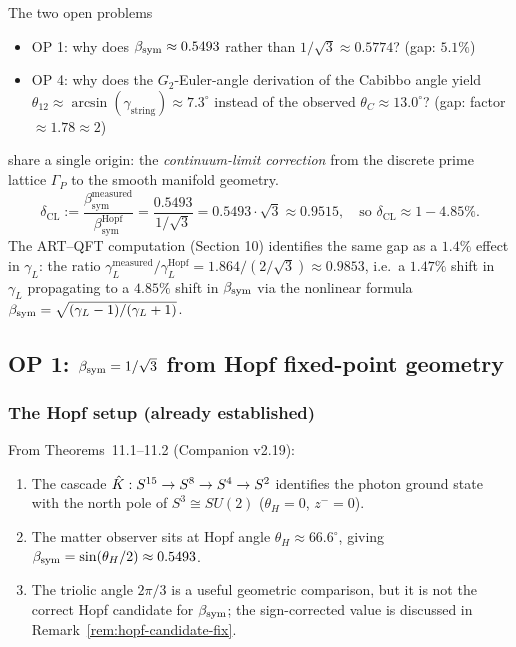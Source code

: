\begin{remark}
The two open problems
\begin{itemize}
\item OP 1: why does $\beta_{\mathrm{sym}} \approx 0.5493$ rather than $1/\sqrt{3}
  \approx 0.5774$? (gap: $5.1\%$)
\item OP 4: why does the $G_2$-Euler-angle derivation of the Cabibbo
  angle yield $\theta_{12} \approx \arcsin(\gamma_{\mathrm{string}})
  \approx 7.3^\circ$ instead of the observed $\theta_C \approx 13.0^\circ$?
  (gap: factor $\approx 1.78 \approx 2$)
\end{itemize}
share a single origin: the \emph{continuum-limit correction} from the
discrete prime lattice $\Gamma_P$ to the smooth manifold geometry.
\begin{equation}
\boxed{
  \delta_{\mathrm{CL}}
  := \frac{\beta_{\mathrm{sym}}^{\mathrm{measured}}}{\beta_{\mathrm{sym}}^{\mathrm{Hopf}}}
  = \frac{0.5493}{1/\sqrt{3}}
  = 0.5493 \cdot \sqrt{3}
  \approx 0.9515,
  \quad
  \text{so } \delta_{\mathrm{CL}} \approx 1 - 4.85\%.
}
\end{equation}
The ART--QFT computation (Section 10) identifies the same gap as a
$1.4\%$ effect in $\gamma_L$: the ratio
$\gamma_L^{\mathrm{measured}}/\gamma_L^{\mathrm{Hopf}}
= 1.864 / (2/\sqrt{3}) \approx 0.9853$,
i.e.\ a $1.47\%$ shift in $\gamma_L$ propagating to a $4.85\%$ shift
in $\beta_{\mathrm{sym}}$ via the nonlinear formula
$\beta_{\mathrm{sym}} = \sqrt{(\gamma_L-1)/(\gamma_L+1)}$.
\end{remark}

\subsection{OP 1: \texorpdfstring{$\beta_{\mathrm{sym}} = 1/\sqrt{3}$}{β\_sym = 1/√3}
  from Hopf fixed-point geometry}
\label{sec:op1}

\subsubsection{The Hopf setup (already established)}

From Theorems~11.1--11.2 (Companion v2.19):
\begin{enumerate}
\item The cascade $\hat{K}: S^{15} \to S^8 \to S^4 \to S^2$ identifies
  the photon ground state with the north pole of $S^3 \cong SU(2)$
  ($\theta_H = 0$, $z^- = 0$).
\item The matter observer sits at Hopf angle $\theta_H \approx 66.6^\circ$,
  giving $\beta_{\mathrm{sym}} = \sin(\theta_H/2) \approx 0.5493$.
\item The triolic angle $2\pi/3$ is a useful geometric comparison, but it
  is not the correct Hopf candidate for $\beta_{\mathrm{sym}}$; the sign-corrected value
  is discussed in Remark~\ref{rem:hopf-candidate-fix}.
\end{enumerate}


